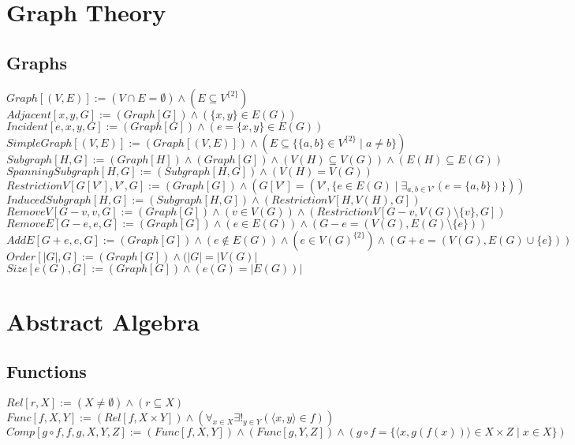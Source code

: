 \documentclass{book}
\newcommand{\abr}{:=}
\newcommand{\pr}[1]{\left(#1\right)}
\newcommand{\setbackgroundcolour}{\pagecolor[rgb]{0.2,0.2,0.2}}
\newcommand{\settextcolour}{\color[rgb]{0.8,0.8,0.8}}
\newcommand{\invertbackgroundtext}{\setbackgroundcolour\settextcolour}
\newcommand{\st}{\mathbin{|}}
\begin{document}
\invertbackgroundtext
\setlength{\parindent}{0pt}

\tableofcontents

\chapter{Graph Theory}
\section{Graphs}
$Graph[(V, E)] \abr (V \cap E = \emptyset) \land (E \subseteq V^{\{2\}})$ \\
$Adjacent[x, y, G] \abr (Graph[G]) \land \pr{\{x, y\} \in E(G)}$ \\
$Incident[e, x, y, G] \abr (Graph[G]) \land \pr{e = \{x, y\} \in E(G)}$ \\
$SimpleGraph[(V, E)] \abr \pr{Graph[(V, E)]} \land (E \subseteq \{\{a, b\} \in V^{\{2\}} \st a \neq b\})$ \\
$Subgraph[H, G] \abr (Graph[H]) \land (Graph[G]) \land \pr{V(H) \subseteq V(G)} \land \pr{E(H) \subseteq E(G)}$ \\
$SpanningSubgraph[H, G] \abr (Subgraph[H, G]) \land \pr{V(H) = V(G)}$ \\
$RestrictionV[G[V'], V', G] \abr (Graph[G]) \land \pr{G[V'] = \pr{V', \{e \in E(G) \st \exists_{a, b \in V'}(e = \{a, b\})\}}}$ \\
$InducedSubgraph[H, G] \abr (Subgraph[H, G]) \land \pr{RestrictionV[H, V(H), G]}$ \\
$RemoveV[G - v, v, G] \abr (Graph[G]) \land \pr{v \in V(G)} \land \pr{RestrictionV[G - v, V(G) \setminus \{v\}, G]}$ \\
$RemoveE[G - e, e, G] \abr (Graph[G]) \land \pr{e \in E(G)} \land \pr{G - e = \pr{V(G), E(G) \setminus \{e\}}}$ \\
$AddE[G + e, e, G] \abr (Graph[G]) \land \pr{e \notin E(G)} \land \pr{e \in V(G)^{\{2\}}} \land \pr{G + e = \pr{V(G), E(G) \cup \{e\}}}$ \\
$Order[|G|, G] \abr (Graph[G]) \land (|G| = |V(G)|$ \\
$Size[e(G), G] \abr (Graph[G]) \land \pr{e(G) = |E(G)}|$ \\



\chapter{Abstract Algebra}
\section{Functions}
$Rel[r, X] \abr (X \neq \emptyset) \land (r \subseteq X)$ \\
$Func[f, X, Y] \abr (Rel[f, X \times Y]) \land \pr{\forall_{x \in X} \exists!_{y \in Y}(\langle x, y \rangle \in f)}$ \\
$Comp[g \circ f, f, g, X, Y, Z] \abr (Func[f, X, Y]) \land (Func[g, Y, Z]) \land \pr{g \circ f = \{\langle x, g\pr{f(x)} \rangle \in X \times Z \st x \in X\}}$ \\
\end{document}
